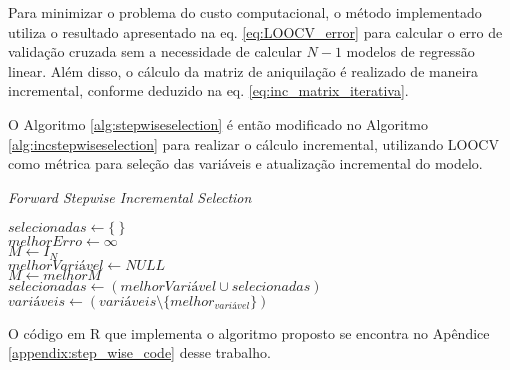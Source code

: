 Para minimizar o problema do custo computacional, o método implementado utiliza o resultado apresentado na eq. \ref{eq:LOOCV_error} para calcular o erro de validação cruzada sem a necessidade de calcular $N-1$ modelos de regressão linear. Além disso, o cálculo da matriz de aniquilação é realizado de maneira incremental, conforme deduzido na eq. \ref{eq:inc_matrix_iterativa}.

O Algoritmo \ref{alg:stepwiseselection} é então modificado no Algoritmo \ref{alg:incstepwiseselection} para realizar o cálculo incremental, utilizando LOOCV como métrica para seleção das variáveis e atualização incremental do modelo.

\begin{algorithm}[!htb]
    \caption{\textit{Forward Stepwise Incremental Selection}}
    
    $selecionadas \gets \{\ \}$ \\
    $melhorErro \gets \infty$ \\
    $M \gets I_N$ \\

    { 
        $melhorVariável \gets NULL$ \\
        $M \gets melhorM $ \\
        $selecionadas \gets (melhorVariável \cup selecionadas)$ \\
        $variáveis \gets (variáveis \setminus \{melhor_{variável}\})$ \\
    }
    \label{alg:incstepwiseselection}
\end{algorithm}

O código em R que implementa o algoritmo proposto se encontra no Apêndice \ref{appendix:step_wise_code} desse trabalho.

\FloatBarrier

